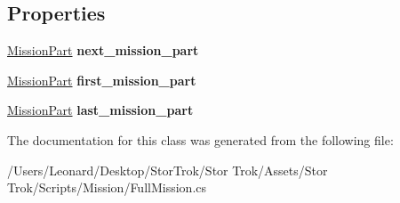 \subsection*{Properties}
\begin{DoxyCompactItemize}
\item 
\mbox{\label{class_full_mission_a298537c804e875cbcb35d1263d8cf61e}} 
\hyperlink{class_mission_part}{Mission\+Part} {\bfseries next\+\_\+mission\+\_\+part}
\item 
\mbox{\label{class_full_mission_a63e47c68aa6392dbcf8c767ca1c91dc0}} 
\hyperlink{class_mission_part}{Mission\+Part} {\bfseries first\+\_\+mission\+\_\+part}
\item 
\mbox{\label{class_full_mission_a90519c731c203edb8cf794f4f65f90e6}} 
\hyperlink{class_mission_part}{Mission\+Part} {\bfseries last\+\_\+mission\+\_\+part}
\end{DoxyCompactItemize}


The documentation for this class was generated from the following file\+:\begin{DoxyCompactItemize}
\item 
/\+Users/\+Leonard/\+Desktop/\+Stor\+Trok/\+Stor Trok/\+Assets/\+Stor Trok/\+Scripts/\+Mission/Full\+Mission.\+cs\end{DoxyCompactItemize}
